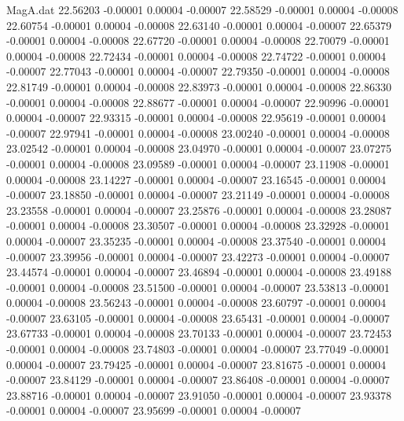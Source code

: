 \begin{filecontents}{MagA.dat}
  22.56203   -0.00001    0.00004   -0.00007
  22.58529   -0.00001    0.00004   -0.00008
  22.60754   -0.00001    0.00004   -0.00008
  22.63140   -0.00001    0.00004   -0.00007
  22.65379   -0.00001    0.00004   -0.00008
  22.67720   -0.00001    0.00004   -0.00008
  22.70079   -0.00001    0.00004   -0.00008
  22.72434   -0.00001    0.00004   -0.00008
  22.74722   -0.00001    0.00004   -0.00007
  22.77043   -0.00001    0.00004   -0.00007
  22.79350   -0.00001    0.00004   -0.00008
  22.81749   -0.00001    0.00004   -0.00008
  22.83973   -0.00001    0.00004   -0.00008
  22.86330   -0.00001    0.00004   -0.00008
  22.88677   -0.00001    0.00004   -0.00007
  22.90996   -0.00001    0.00004   -0.00007
  22.93315   -0.00001    0.00004   -0.00008
  22.95619   -0.00001    0.00004   -0.00007
  22.97941   -0.00001    0.00004   -0.00008
  23.00240   -0.00001    0.00004   -0.00008
  23.02542   -0.00001    0.00004   -0.00008
  23.04970   -0.00001    0.00004   -0.00007
  23.07275   -0.00001    0.00004   -0.00008
  23.09589   -0.00001    0.00004   -0.00007
  23.11908   -0.00001    0.00004   -0.00008
  23.14227   -0.00001    0.00004   -0.00007
  23.16545   -0.00001    0.00004   -0.00007
  23.18850   -0.00001    0.00004   -0.00007
  23.21149   -0.00001    0.00004   -0.00008
  23.23558   -0.00001    0.00004   -0.00007
  23.25876   -0.00001    0.00004   -0.00008
  23.28087   -0.00001    0.00004   -0.00008
  23.30507   -0.00001    0.00004   -0.00008
  23.32928   -0.00001    0.00004   -0.00007
  23.35235   -0.00001    0.00004   -0.00008
  23.37540   -0.00001    0.00004   -0.00007
  23.39956   -0.00001    0.00004   -0.00007
  23.42273   -0.00001    0.00004   -0.00007
  23.44574   -0.00001    0.00004   -0.00007
  23.46894   -0.00001    0.00004   -0.00008
  23.49188   -0.00001    0.00004   -0.00008
  23.51500   -0.00001    0.00004   -0.00007
  23.53813   -0.00001    0.00004   -0.00008
  23.56243   -0.00001    0.00004   -0.00008
  23.60797   -0.00001    0.00004   -0.00007
  23.63105   -0.00001    0.00004   -0.00008
  23.65431   -0.00001    0.00004   -0.00007
  23.67733   -0.00001    0.00004   -0.00008
  23.70133   -0.00001    0.00004   -0.00007
  23.72453   -0.00001    0.00004   -0.00008
  23.74803   -0.00001    0.00004   -0.00007
  23.77049   -0.00001    0.00004   -0.00007
  23.79425   -0.00001    0.00004   -0.00007
  23.81675   -0.00001    0.00004   -0.00007
  23.84129   -0.00001    0.00004   -0.00007
  23.86408   -0.00001    0.00004   -0.00007
  23.88716   -0.00001    0.00004   -0.00007
  23.91050   -0.00001    0.00004   -0.00007
  23.93378   -0.00001    0.00004   -0.00007
  23.95699   -0.00001    0.00004   -0.00007

\end{filecontents}
